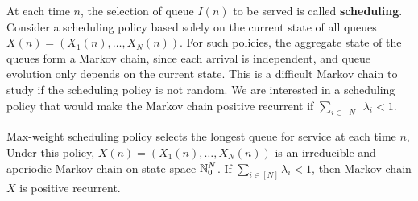 \documentclass[a4paper,10pt,english]{article}
\begin{document}
At each time $n$, the selection of queue $I(n)$ to be served is called \textbf{scheduling}.  
Consider a scheduling policy  based solely on the current state of all queues $X(n) = (X_1(n), \dots, X_N(n))$. 
For such policies, the aggregate state of the queues form a Markov chain, 
since each arrival is independent, and queue evolution only depends on the current state. 
This is a difficult Markov chain to study if the scheduling policy is not random. 
We are interested in a scheduling policy that would make the Markov chain positive recurrent if $\sum_{i \in [N]}\lambda_i < 1$. 
\begin{thm}
Max-weight scheduling policy selects the longest queue for service at each time $n$, 
Under this policy, $X(n) = (X_1(n), \dots, X_N(n))$ is an irreducible and aperiodic Markov chain on state space $\mathbb{N}_0^N$. 
If $\sum_{i \in [N]} \lambda _i < 1$, then Markov chain $X$ is positive recurrent. 
\end{thm}
\end{document}
